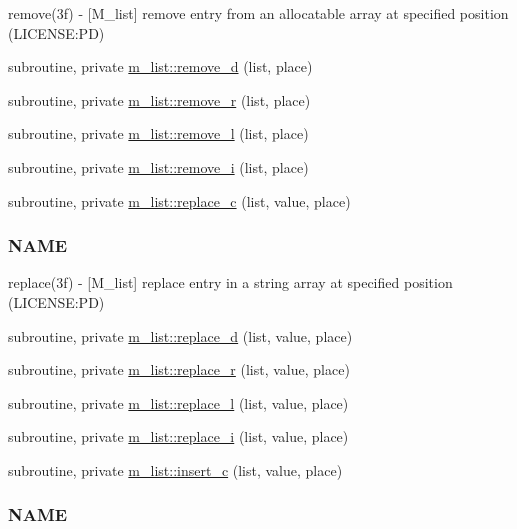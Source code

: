 \begin{DoxyCompactItemize}
\begin{DoxyCompactList}
remove(3f) -\/ \mbox{[}M\+\_\+list\mbox{]} remove entry from an allocatable array at specified position (L\+I\+C\+E\+N\+SE\+:PD) \end{DoxyCompactList}\item 
subroutine, private \mbox{\hyperlink{namespacem__list_a6c5f971866302b40b5952ad919203461}{m\+\_\+list\+::remove\+\_\+d}} (list, place)
\item 
subroutine, private \mbox{\hyperlink{namespacem__list_af5940ed6b39d9e3429e2784767db9e56}{m\+\_\+list\+::remove\+\_\+r}} (list, place)
\item 
subroutine, private \mbox{\hyperlink{namespacem__list_a138b6450613db943177df6258f58e89b}{m\+\_\+list\+::remove\+\_\+l}} (list, place)
\item 
subroutine, private \mbox{\hyperlink{namespacem__list_acdc3299515ed0402f4213d76d3e4d4cf}{m\+\_\+list\+::remove\+\_\+i}} (list, place)
\item 
subroutine, private \mbox{\hyperlink{namespacem__list_adddd2b7443557b3727320c314170e001}{m\+\_\+list\+::replace\+\_\+c}} (list, value, place)
\begin{DoxyCompactList}\small\item\em \subsubsection*{N\+A\+ME}

replace(3f) -\/ \mbox{[}M\+\_\+list\mbox{]} replace entry in a string array at specified position (L\+I\+C\+E\+N\+SE\+:PD) \end{DoxyCompactList}\item 
subroutine, private \mbox{\hyperlink{namespacem__list_a9cac0a0b0d325d26267d37648f8eada6}{m\+\_\+list\+::replace\+\_\+d}} (list, value, place)
\item 
subroutine, private \mbox{\hyperlink{namespacem__list_ac2ef50718d66bfe2fc102a3d48a28cb2}{m\+\_\+list\+::replace\+\_\+r}} (list, value, place)
\item 
subroutine, private \mbox{\hyperlink{namespacem__list_a0de977b7f38554ccd2e8b6e668f11648}{m\+\_\+list\+::replace\+\_\+l}} (list, value, place)
\item 
subroutine, private \mbox{\hyperlink{namespacem__list_a8c67651ca2c2c90d921f23146577491b}{m\+\_\+list\+::replace\+\_\+i}} (list, value, place)
\item 
subroutine, private \mbox{\hyperlink{namespacem__list_ac9b841bea6c2cfed1608b2809aaf07b4}{m\+\_\+list\+::insert\+\_\+c}} (list, value, place)
\begin{DoxyCompactList}\small\item\em \subsubsection*{N\+A\+ME}


\end{DoxyCompactList}
\end{DoxyCompactItemize}
